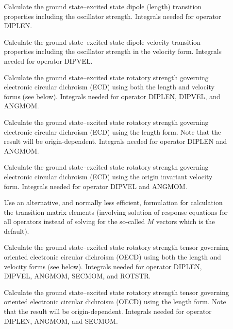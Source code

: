 \begin{description}
\item[] 
%
Calculate the ground state--excited state dipole (length) transition properties including
the oscillator strength.
Integrals needed for operator DIPLEN.

\item[] 
%
Calculate the ground state--excited state dipole-velocity  transition properties including
the oscillator strength in the velocity form.
Integrals needed for operator DIPVEL.

\item[] 
%
Calculate the ground state--excited state rotatory strength governing electronic circular dichroism
(ECD) using both the length and velocity forms (see below).
Integrals needed for operator DIPLEN, DIPVEL, and ANGMOM.

\item[] 
%
Calculate the ground state--excited state rotatory strength governing electronic circular dichroism
(ECD) using the length form. Note that the result will be origin-dependent.
Integrals needed for operator DIPLEN and ANGMOM.

\item[] 
%
Calculate the ground state--excited state rotatory strength governing electronic circular dichroism
(ECD) using the origin invariant velocity form.
Integrals needed for operator DIPVEL and ANGMOM.

\item[] 
%
Use an alternative, and normally less efficient, formulation for calculation
the transition matrix elements (involving solution of response equations for 
all operators instead of solving for the so-called $M$ vectors which is the default).

\item[] 
%
Calculate the ground state--excited state rotatory strength tensor governing oriented electronic circular dichroism
(OECD) using both the length and velocity forms (see below).
Integrals needed for operator DIPLEN, DIPVEL, ANGMOM, SECMOM, and ROTSTR.

\item[] 
%
Calculate the ground state--excited state rotatory strength tensor governing oriented electronic circular dichroism
(OECD) using the length form. Note that the result will be origin-dependent.
Integrals needed for operator DIPLEN, ANGMOM, and SECMOM.


\end{description}
